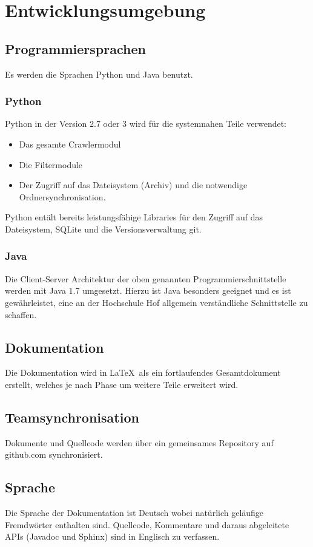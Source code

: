\chapter{Entwicklungsumgebung} \label{spec:req:devenv}
\section{Programmiersprachen}
	Es werden die Sprachen Python und Java benutzt.
	\subsection{Python}
		Python in der Version 2.7 oder 3 wird für die systemnahen Teile verwendet:
		\begin{itemize}
			\item Das gesamte Crawlermodul
			\item Die Filtermodule
			\item Der Zugriff auf das Dateisystem (Archiv) und die notwendige Ordnersynchronisation.
		\end{itemize}
		Python entält bereits leistungsfähige Libraries für den Zugriff auf das Dateisystem, SQLite und 
		die Versionsverwaltung git.
	\subsection{Java}
		Die Client-Server Architektur der oben genannten Programmierschnittstelle werden 
		mit Java 1.7 umgesetzt.
		Hierzu ist Java besonders geeignet und es ist gewährleistet, 
		eine an der Hochschule Hof allgemein verständliche Schnittstelle zu schaffen.
\section{Dokumentation}
	Die Dokumentation wird in \LaTeX\ als ein fortlaufendes Gesamtdokument erstellt, 
	welches je nach Phase um weitere Teile erweitert wird.
\section{Teamsynchronisation}
	Dokumente und Quellcode werden über ein gemeinsames Repository auf github.com synchronisiert.
\section{Sprache}	
	Die Sprache der Dokumentation ist Deutsch wobei natürlich geläufige Fremdwörter enthalten sind. 
	Quellcode, Kommentare und daraus abgeleitete APIs (Javadoc und Sphinx) sind in Englisch zu verfassen.
